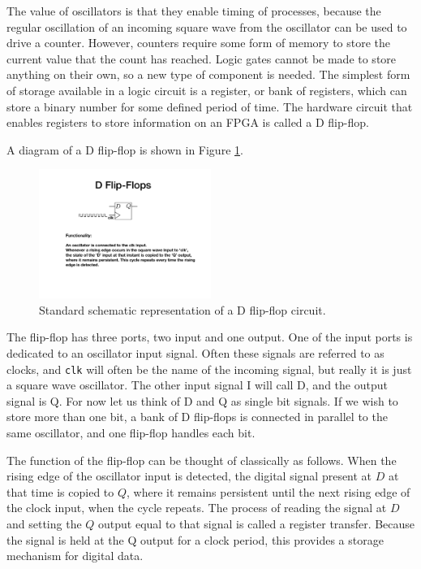 \documentclass[../physical_computing.tex]{subfiles}
\begin{document}
The value of oscillators is that they enable timing of processes, because the regular oscillation of an incoming square wave from the oscillator can be used to drive a counter. However, counters require some form of memory to store the current value that the count has reached. Logic gates cannot be made to store anything on their own, so a new type of component is needed. The simplest form of storage available in a logic circuit is a register, or bank of registers, which can store a binary number for some defined period of time. The hardware circuit that enables registers to store information on an FPGA is called a D flip-flop. 

A diagram of a D flip-flop is shown in Figure
\ref{fig:dflipflop}.

\begin{figure}[htbp]
    \centering
    \includegraphics[width=0.5\textwidth]{figures/d_flip_flop_open.pdf}
    \caption{Standard schematic representation of a  D flip-flop circuit.}
    \label{fig:dflipflop}
\end{figure}

The flip-flop has three ports, two input and one output. One of the input ports is dedicated to an oscillator input signal. Often these signals are referred to as clocks, and \texttt{clk} will often be the name of the incoming signal, but really it is just a square wave oscillator. The other input signal I will call D, and the output signal is Q. For now let us think of D and Q as single bit signals. If we wish to store more than one bit, a bank of D flip-flops is connected in parallel to the same oscillator, and one flip-flop handles each bit.

The function of the flip-flop can be thought of classically as follows. When the rising edge of the oscillator input is detected, the digital signal present at $D$ at that time is copied to $Q$, where it remains persistent until the next rising edge of the clock input, when the cycle repeats. The process of reading the signal at $D$ and setting the $Q$ output equal to that signal is called a register transfer. Because the signal is held at the Q output for a clock period, this provides a storage mechanism for digital data.
\end{document}
